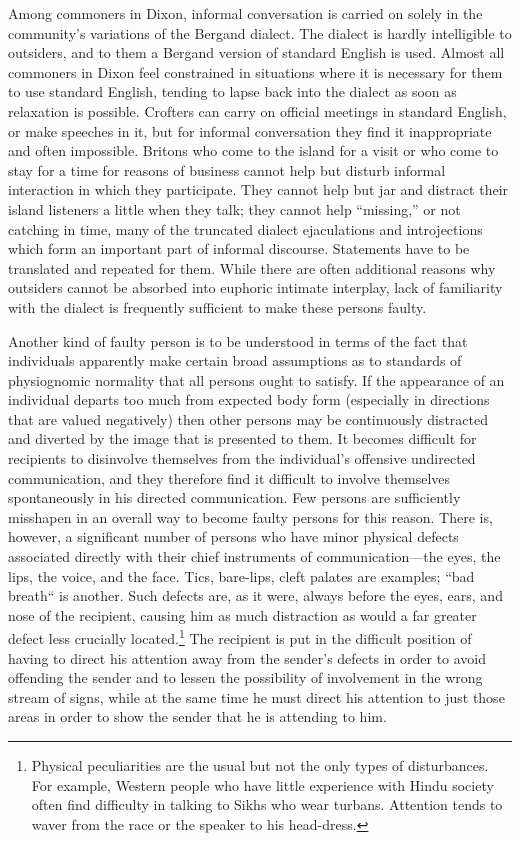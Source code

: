 \documentclass[openany,nobib]{tufte-book}
\begin{document}
Among commoners in Dixon, informal conversation is carried on solely in
the community's variations of the Bergand dialect. The dialect is hardly
intelligible to outsiders, and to them a Bergand version of standard
English is used. Almost all commoners in Dixon feel constrained in
situations where it is necessary for them to use standard English,
tending to lapse back into the dialect as soon as relaxation is
possible. Crofters can carry on official meetings in standard English,
or make speeches in it, but for informal conversation they find it
inappropriate and often impossible. Britons who come to the island for a
visit or who come to stay for a time for reasons of business cannot help
but disturb informal interaction in which they participate. They cannot
help but jar and distract their island listeners a little when they
talk; they cannot help ``missing,'' or not catching in time, many of the
truncated dialect ejaculations and introjections which form an important
part of informal discourse. Statements have to be translated and
repeated for them. While there are often additional reasons why
outsiders cannot be absorbed into euphoric intimate interplay, lack of
familiarity with the dialect is frequently sufficient to make these
persons faulty.

Another kind of faulty person is to be understood in terms of the fact
that individuals apparently make certain broad assumptions as to
standards of physiognomic normality that all persons ought to satisfy.
If the appearance of an individual departs too much from expected body
form (especially in directions that are valued negatively) then other
persons may be continuously distracted and diverted by the image that is
presented to them. It becomes difficult for recipients to disinvolve
themselves from the individual's offensive undirected communication, and
they therefore find it difficult to involve themselves spontaneously in
his directed communication. Few persons are sufficiently misshapen in an
overall way to become faulty persons for this reason. There is, however,
a significant number of persons who have minor physical defects
associated directly with their chief instruments of communication---the
eyes, the lips, the voice, and the face. Tics, bare-lips, cleft palates
are examples; ``bad breath`` is another. Such defects are, as it were,
always before the eyes, ears, and nose of the recipient, causing him as
much distraction as would a far greater defect less crucially
located.\footnote{Physical peculiarities are the usual but not the only
  types of disturbances. For example, Western people who have little
  experience with Hindu society often find difficulty in talking to
  Sikhs who wear turbans. Attention tends to waver from the race or the
  speaker to his head-dress.} The recipient is put in the difficult
position of having to direct his attention away from the sender's
defects in order to avoid offending the sender and to lessen the
possibility of involvement in the wrong stream of signs, while at the
same time he must direct his attention to just those areas in order to
show the sender that he is attending to him.
\end{document}
